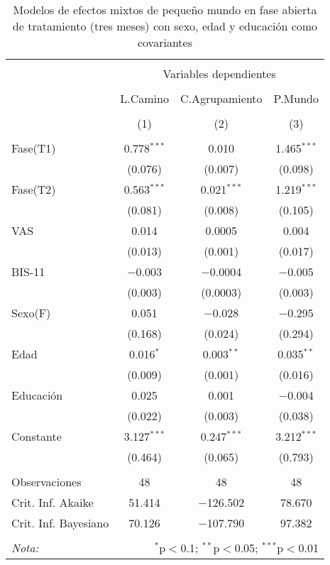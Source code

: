 \begin{table}[!htbp] \centering
    \small
  \caption{Modelos de efectos mixtos de pequeño mundo en fase abierta de tratamiento (tres meses) con sexo, edad y educación como covariantes}
  \label{tab:memL12}
\begin{tabular}{@{\extracolsep{5pt}}lccc}
\\[-1.8ex]\hline
\hline \\[-1.8ex]
 & \multicolumn{3}{c}{Variables dependientes} \\
\cline{2-4}
\\[-1.8ex] & L.Camino & C.Agrupamiento & P.Mundo \\
\\[-1.8ex] & (1) & (2) & (3)\\
\hline \\[-1.8ex]
 Fase(T1) & 0.778$^{***}$ & 0.010 & 1.465$^{***}$ \\
  & (0.076) & (0.007) & (0.098) \\
  Fase(T2) & 0.563$^{***}$ & 0.021$^{***}$ & 1.219$^{***}$ \\
  & (0.081) & (0.008) & (0.105) \\
  VAS & 0.014 & 0.0005 & 0.004 \\
  & (0.013) & (0.001) & (0.017) \\
  BIS-11 & $-$0.003 & $-$0.0004 & $-$0.005 \\
  & (0.003) & (0.0003) & (0.003) \\
  Sexo(F) & 0.051 & $-$0.028 & $-$0.295 \\
  & (0.168) & (0.024) & (0.294) \\
  Edad & 0.016$^{*}$ & 0.003$^{**}$ & 0.035$^{**}$ \\
  & (0.009) & (0.001) & (0.016) \\
  Educación & 0.025 & 0.001 & $-$0.004 \\
  & (0.022) & (0.003) & (0.038) \\
  Constante & 3.127$^{***}$ & 0.247$^{***}$ & 3.212$^{***}$ \\
  & (0.464) & (0.065) & (0.793) \\
 \hline \\[-1.8ex]
Observaciones & 48 & 48 & 48 \\
Crit. Inf. Akaike & 51.414 & $-$126.502 & 78.670 \\
Crit. Inf. Bayesiano & 70.126 & $-$107.790 & 97.382 \\
\hline
\hline \\[-1.8ex]
\textit{Nota:}  & \multicolumn{3}{r}{$^{*}$p$<$0.1; $^{**}$p$<$0.05; $^{***}$p$<$0.01} \\
\end{tabular}
\end{table}

